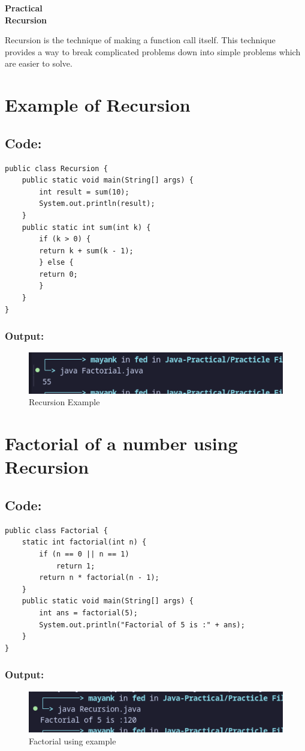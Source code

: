 \documentclass[a4paper,12pt]{article}
\newcounter{practicalno} %
\newcommand{\practicaltitle}[1]{
    \stepcounter{practicalno} %
    \newpage
    \begin{center}
        \vspace{1cm}
        \Large\textbf{Practical \thepracticalno} \\
        \vspace{0.5cm}
        \Large\textbf{#1} %
        \normalsize\vspace{1cm}
    \end{center}
}
\begin{document}
\setcounter{section}{0}

\practicaltitle{Recursion}
Recursion is the technique of making a function call itself. This technique provides a way to break complicated problems down into simple problems which are easier to solve.

\section{Example of Recursion}
\subsection{Code: }
\begin{lstlisting}
public class Recursion {
    public static void main(String[] args) {
        int result = sum(10);
        System.out.println(result);
    }
    public static int sum(int k) {
        if (k > 0) {
        return k + sum(k - 1);
        } else {
        return 0;
        }
    }
}
\end{lstlisting}
\subsubsection{Output: }
\begin{figure}[H]
    \centering
    \includegraphics[width=0.9\linewidth]{images/RecExp.png}
    \caption{Recursion Example}
    \label{fig:sample_image}
\end{figure}

\section{Factorial of a number using Recursion}
\subsection{Code: }
\begin{lstlisting}
public class Factorial {
    static int factorial(int n) {
        if (n == 0 || n == 1)
            return 1;
        return n * factorial(n - 1);
    }
    public static void main(String[] args) {
        int ans = factorial(5);
        System.out.println("Factorial of 5 is :" + ans);
    }
}   
\end{lstlisting}
\subsubsection{Output: }
\begin{figure}[H]
    \centering
    \includegraphics[width=0.9\linewidth]{images/RecursionOut.png}
    \caption{Factorial using example}
    \label{fig:sample_image}
\end{figure}
\end{document}
